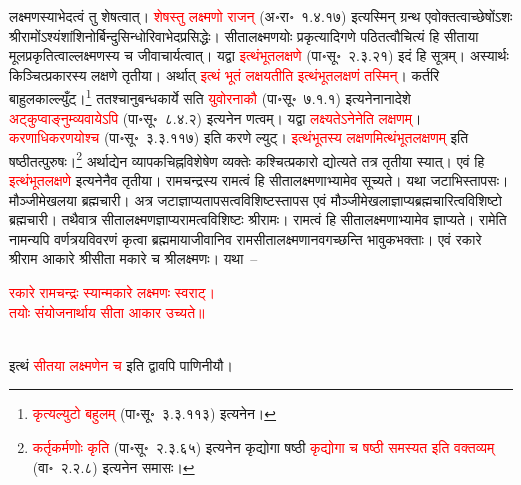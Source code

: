 \begin{sloppypar}\justifying\noindent लक्ष्मणस्याभेदत्वं तु शेषत्वात्। \textcolor{red}{शेषस्तु लक्ष्मणो राजन्‌} (अ॰रा॰~१.४.१७) इत्यस्मिन् ग्रन्थ एवोक्तत्वाच्छेषोंऽशः श्रीरामोंऽश्यंशांशिनोर्बिन्दु\-सिन्धोरिवाभेद\-प्रसिद्धेः। सीता\-लक्ष्मणयोः प्रकृत्यादि\-गणे पठितत्वौचित्यं हि सीताया मूल\-प्रकृतित्वाल्लक्ष्मणस्य च जीवाचार्यत्वात्। यद्वा \textcolor{red}{इत्थं\-भूत\-लक्षणे} (पा॰सू॰~२.३.२१) इदं हि सूत्रम्। अस्यार्थः किञ्चित्प्रकारस्य लक्षणे तृतीया। अर्थात् \textcolor{red}{इत्थं भूतं लक्षयतीति इत्थं\-भूत\-लक्षणं तस्मिन्‌}। कर्तरि बाहुलकाल्ल्युँट्।\footnote{\textcolor{red}{कृत्यल्युटो बहुलम्} (पा॰सू॰~३.३.११३) इत्यनेन।} ततश्चानुबन्ध\-कार्ये सति \textcolor{red}{युवोरनाकौ} (पा॰सू॰~७.१.१) इत्यनेनानादेशे \textcolor{red}{अट्कुप्वाङ्नुम्व्यवायेऽपि} (पा॰सू॰~८.४.२) इत्यनेन णत्वम्। यद्वा \textcolor{red}{लक्ष्यतेऽनेनेति लक्षणम्‌}। \textcolor{red}{करणाधिकरणयोश्च} (पा॰सू॰~३.३.११७) इति करणे ल्युट्। \textcolor{red}{इत्थं\-भूतस्य लक्षणमित्थं\-भूत\-लक्षणम्} इति षष्ठी\-तत्पुरुषः।\footnote{\textcolor{red}{कर्तृकर्मणोः कृति} (पा॰सू॰~२.३.६५) इत्यनेन कृद्योगा षष्ठी \textcolor{red}{कृद्योगा च षष्ठी समस्यत इति वक्तव्यम्‌} (वा॰~२.२.८) इत्यनेन समासः।} अर्थाद्येन व्यापक\-चिह्न\-विशेषेण व्यक्तेः कश्चित्प्रकारो द्योत्यते तत्र तृतीया स्यात्। एवं हि \textcolor{red}{इत्थं\-भूत\-लक्षणे} इत्यनेनैव तृतीया। रामचन्द्रस्य रामत्वं हि सीता\-लक्ष्मणाभ्यामेव सूच्यते। यथा जटाभिस्तापसः। मौञ्जी\-मेखलया ब्रह्मचारी। अत्र जटा\-ज्ञाप्य\-तापसत्व\-विशिष्टस्तापस एवं मौञ्जी\-मेखला\-ज्ञाप्य\-ब्रह्मचारित्व\-विशिष्टो ब्रह्मचारी। तथैवात्र सीता\-लक्ष्मण\-ज्ञाप्य\-रामत्व\-विशिष्टः श्रीरामः। रामत्वं हि सीता\-लक्ष्मणाभ्यामेव ज्ञाप्यते। रामेति नामन्यपि वर्ण\-त्रय\-विवरणं कृत्वा ब्रह्म\-माया\-जीवानिव राम\-सीता\-लक्ष्मणानवगच्छन्ति भावुक\-भक्ताः। एवं रकारे श्रीराम आकारे श्रीसीता मकारे च श्रीलक्ष्मणः। यथा~–\end{sloppypar}
\centering\textcolor{red}{रकारे रामचन्द्रः स्यान्मकारे लक्ष्मणः स्वराट्।\nopagebreak\\
तयोः संयोजनार्थाय सीता आकार उच्यते॥}\nopagebreak\\
\\
\begin{sloppypar}\justifying\noindent इत्थं \textcolor{red}{सीतया लक्ष्मणेन च} इति द्वावपि पाणिनीयौ।\end{sloppypar}
